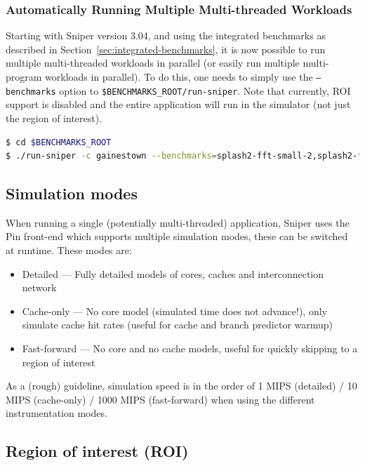 \documentclass[a4paper,11pt,titlepage]{article}
\newcommand{\cmd}[1]{{\tt #1}}
\begin{document}
\subsubsection{Automatically Running Multiple Multi-threaded Workloads}

Starting with Sniper version 3.04, and using the integrated benchmarks as described in Section~\ref{sec:integrated-benchmarks},
it is now possible to run multiple multi-threaded workloads in parallel (or easily run multiple multi-program workloads
in parallel). To do this, one needs to simply use the \cmd{--benchmarks} option to \cmd{\$BENCHMARKS\_ROOT/run-sniper}.
Note that currently, ROI support is disabled and the entire application will run in the simulator (not just the region
of interest).

\begin{lstlisting}[label=benchmarks-multiple-multi-threaded,caption=Running Multiple Multi-threaded Benchmarks,rulecolor=\color{DarkSlateBlue},language=Bash]
$ cd $BENCHMARKS_ROOT
$ ./run-sniper -c gainestown --benchmarks=splash2-fft-small-2,splash2-fft-small-2
\end{lstlisting}


\subsection{Simulation modes}

When running a single (potentially multi-threaded) application, Sniper uses the Pin front-end
which supports multiple simulation modes, these can be switched at runtime. These modes are:

\begin{itemize}
\item Detailed --- Fully detailed models of cores, caches and interconnection network
\item Cache-only --- No core model (simulated time does not advance!), only simulate cache hit rates (useful for cache and branch predictor warmup)
\item Fast-forward --- No core and no cache models, useful for quickly skipping to a region of interest
\end{itemize}

As a (rough) guideline, simulation speed is in the order of 1 MIPS (detailed) / 10 MIPS (cache-only)
/ 1000 MIPS (fast-forward) when using the different instrumentation modes.


\subsection{Region of interest (ROI)}
\end{document}
